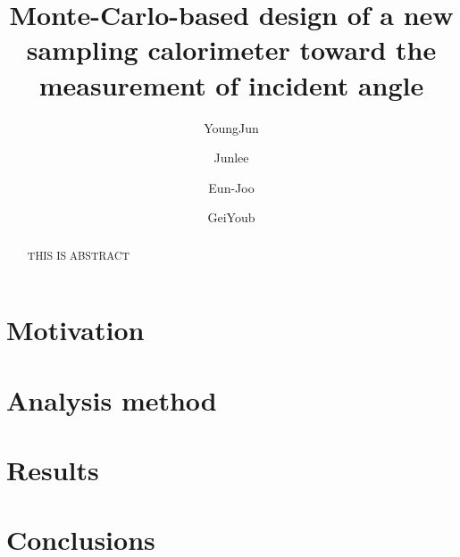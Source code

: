 \documentclass[jkps,preprint,fleqn,showpacs,showkeys]{revtex4}
\begin{document}
\setcounter{page}{0}
\title[]{ Monte-Carlo-based design of a new sampling calorimeter toward the measurement of incident angle }

\author{YoungJun }
\author{Junlee }
\author{Eun-Joo }
\author{GeiYoub  }


\begin{abstract}
THIS IS ABSTRACT

\end{abstract}


\maketitle

\section{Motivation}
\label{sec:mot}

\section{Analysis method}
\label{sec:ana}

\section{Results}
\label{sec:res}


\section{Conclusions}
\label{sec:con}


\begin{acknowledgments}
\end{acknowledgments}


\end{document}
